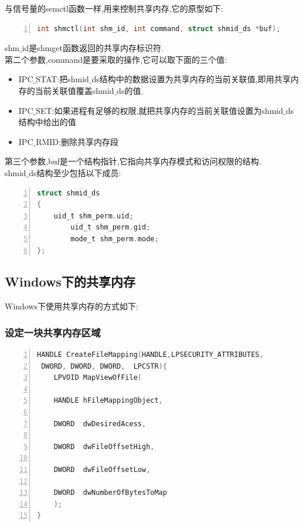 \documentclass[a4paper,12pt,notitlepage]{article}
\begin{document}
	与信号量的semctl函数一样,用来控制共享内存,它的原型如下:
	
\begin{lstlisting}[frame=shadowbox,numbers=left,language=C]
int shmctl(int shm_id, int command, struct shmid_ds *buf);
\end{lstlisting}
	
	shm$\_$id是shmget函数返回的共享内存标识符.\\
	
	第二个参数,command是要采取的操作,它可以取下面的三个值:
	
\begin{itemize}
	\item IPC$\_$STAT:把shmid$\_$ds结构中的数据设置为共享内存的当前关联值,即用共享内存的当前关联值覆盖shmid$\_$ds的值.
	\item IPC$\_$SET:如果进程有足够的权限,就把共享内存的当前关联值设置为shmid$\_$ds结构中给出的值
	\item IPC$\_$RMID:删除共享内存段
\end{itemize}

	第三个参数,buf是一个结构指针,它指向共享内存模式和访问权限的结构.\\
	
	shmid$\_$ds结构至少包括以下成员:
	
\begin{lstlisting}[frame=shadowbox,numbers=left,language=C]
struct shmid_ds  
{  
	uid_t shm_perm.uid;  
		uid_t shm_perm.gid;  
		mode_t shm_perm.mode;  
};  
\end{lstlisting}

\subsection{Windows下的共享内存}

	Windows下使用共享内存的方式如下:

\subsubsection{设定一块共享内存区域}
     
\begin{lstlisting}[frame=shadowbox,numbers=left,language=C]
HANDLE CreateFileMapping(HANDLE,LPSECURITY_ATTRIBUTES,
 DWORD, DWORD, DWORD,  LPCSTR){
	LPVOID MapViewOfFile(

	HANDLE hFileMappingObject,

	DWORD  dwDesiredAcess,

	DWORD  dwFileOffsetHigh,

	DWORD  dwFileOffsetLow,

	DWORD  dwNumberOfBytesToMap
	);
}
\end{lstlisting}
\end{document}
